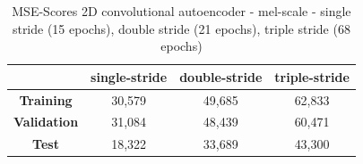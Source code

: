 \begin{table}[htb!]
    \centering
    \begin{tabular}{|c|c|c|c|}
        \hline
         & \textbf{single-stride} & \textbf{double-stride} & \textbf{triple-stride} \\
         \hline
        \textbf{Training} & 30,579 & 49,685 & 62,833 \\
        \hline
        \textbf{Validation} & 31,084 & 48,439 & 60,471\\
        \hline
        \textbf{Test} & 18,322 & 33,689 & 43,300\\
        \hline
    \end{tabular}
    \caption{MSE-Scores 2D convolutional autoencoder - mel-scale - single stride (15 epochs), double stride (21 epochs), triple stride (68 epochs)}
    \label{tab:res_scores_2Dcae_1str_mel}
\end{table}

